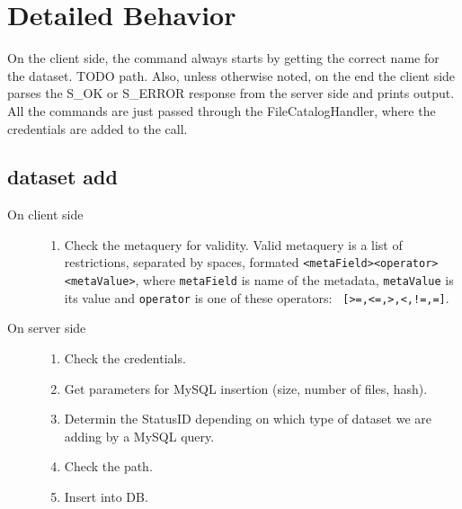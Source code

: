 \documentclass{scrreprt}
\begin{document}
\chapter{Detailed Behavior} \label{chap:Details}

On the client side, the command always starts by getting the correct name for the dataset. TODO path. Also, unless otherwise noted, on the end the client side parses the S_OK or S_ERROR response from the server side and prints output.
All the commands are just passed through the FileCatalogHandler, where the credentials are added to the call. %


\section{dataset add}
\begin{description}
%
\item[On client side] \hfill 
\begin{enumerate}
\item Check the metaquery for validity. Valid metaquery is a list of restrictions, separated by spaces, formated \texttt{<metaField><operator><metaValue>}, where \texttt{metaField} is name of the metadata, \texttt{metaValue} is its value and \texttt{operator} is one of these operators: \texttt{ [>=,<=,>,<,!=,=]}. 
\end{enumerate}
%
\item[On server side] \hfill 
\begin{enumerate}
\item Check the credentials.
\item Get parameters for MySQL insertion (size, number of files, hash).
\item Determin the StatusID depending on which type of dataset we are adding by a MySQL query. 
\item Check the path.
\item Insert into DB.
\end{enumerate}

\end{description}
\end{document}
